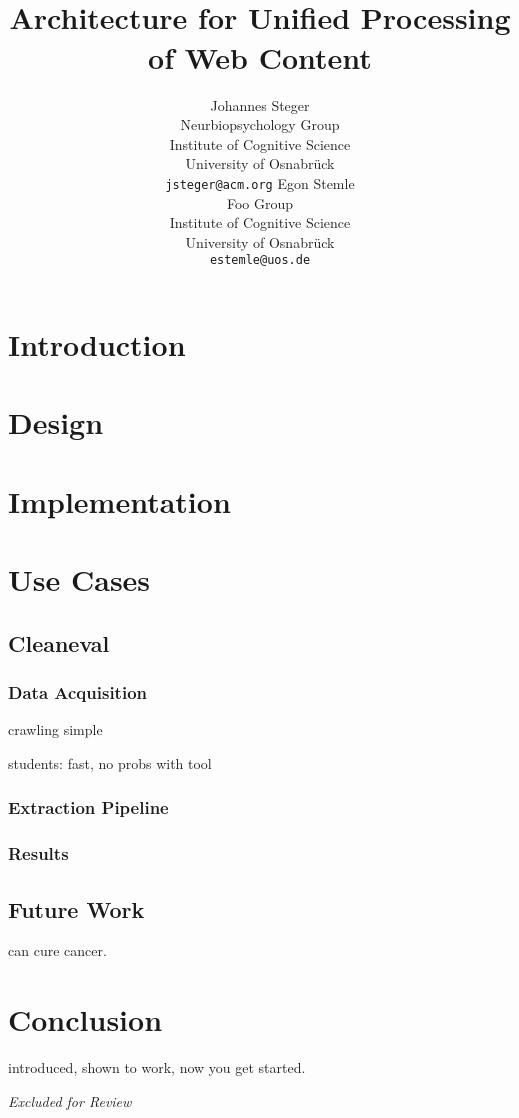 \documentclass[11pt]{article}
\title{\review{KrdWrd} \\
  Architecture for Unified Processing of Web Content}
\author{Johannes Steger\\
  Neurbiopsychology Group\\
  Institute of Cognitive Science\\
  University of Osnabr\"uck\\
  {\tt jsteger@acm.org}  \And
  Egon Stemle\\
  Foo Group\\
  Institute of Cognitive Science\\
  University of Osnabr\"uck\\
  {\tt estemle@uos.de}}
\date{}
\newcommand{\review}[1]{{\textit{Excluded for Review}}}
\begin{document}
\maketitle
\begin{abstract}

\end{abstract}

\section{Introduction}


\section{Design}


\section{Implementation}


\section{Use Cases}

\subsection{Cleaneval}
\subsubsection{Data Acquisition}
crawling simple

students: fast, no probs with tool

\subsubsection{Extraction Pipeline}

\subsubsection{Results}

\subsection{Future Work}
can cure cancer.

\section{Conclusion}
introduced, shown to work, now you get started.

\review{
\section*{Acknowledgments}

}



\end{document}
